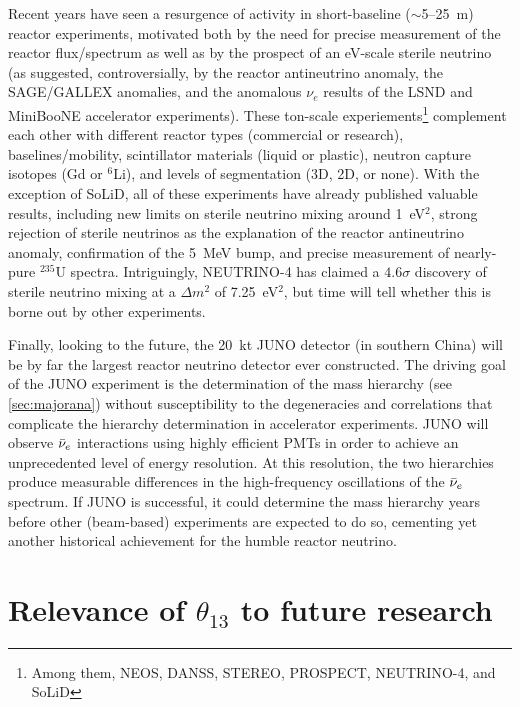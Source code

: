 \documentclass[../thesis.tex]{subfiles}
\begin{document}
Recent years have seen a resurgence of activity in short-baseline ($\sim$5--25~m) reactor experiments, motivated both by the need for precise measurement of the reactor flux/spectrum as well as by the prospect of an eV-scale sterile neutrino (as suggested, controversially, by the reactor antineutrino anomaly, the SAGE/GALLEX anomalies, and the anomalous $\nu_e$ results of the LSND and MiniBooNE accelerator experiments). These ton-scale experiements\footnote{Among them, NEOS, DANSS, STEREO, PROSPECT, NEUTRINO-4, and SoLiD} complement each other with different reactor types (commercial or research), baselines/mobility, scintillator materials (liquid or plastic), neutron capture isotopes (Gd or $^6$Li), and levels of segmentation (3D, 2D, or none). With the exception of SoLiD, all of these experiments have already published valuable results, including new limits on sterile neutrino mixing around 1~eV$^2$, strong rejection of sterile neutrinos as the explanation of the reactor antineutrino anomaly, confirmation of the 5~MeV bump, and precise measurement of nearly-pure $^{235}$U spectra. Intriguingly, NEUTRINO-4 has claimed a $4.6\sigma$ discovery of sterile neutrino mixing at a $\Delta m^2$ of 7.25~eV$^2$, but time will tell whether this is borne out by other experiments.

Finally, looking to the future, the 20~kt JUNO detector (in southern China) will be by far the largest reactor neutrino detector ever constructed. The driving goal of the JUNO experiment is the determination of the mass hierarchy (see \autoref{sec:majorana}) without susceptibility to the degeneracies and correlations that complicate the hierarchy determination in accelerator experiments. JUNO will observe $\bar\nu_e$ interactions using highly efficient PMTs in order to achieve an unprecedented level of energy resolution. At this resolution, the two hierarchies produce measurable differences in the high-frequency oscillations of the $\bar\nu_e$ spectrum. If JUNO is successful, it could determine the mass hierarchy years before other (beam-based) experiments are expected to do so, cementing yet another historical achievement for the humble reactor neutrino.

\section{Relevance of $\theta_{13}$ to future research}
\label{sec:futureRelevance}
\end{document}

